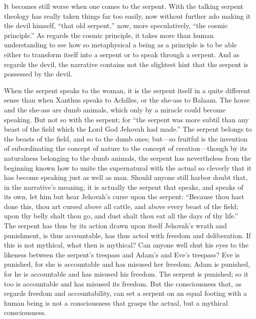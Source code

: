 \documentclass[12pt]{book}
\newcommand{\opage}[1]{\marginnote{\footnotesize\textit{[#1]}}}
\begin{document}
It becomes still worse when one comes to the serpent. With the talking
serpent theology has really taken things far too easily, now without
further ado making it the devil himself, ``that old serpent,'' now, more
speculatively, ``the cosmic principle.'' As regards the cosmic
principle, it takes more than human understanding to see how so
metaphysical a being as a principle is to be able either to transform
itself into a serpent or to speak through a serpent. And as regards the
devil, the narrative contains not the slightest hint that the serpent
is possessed by the devil.

When the serpent speaks to the woman, it is the serpent itself in a
quite different sense than when Xanthus speaks to Achilles, or the
she-ass to Balaam. The horse and the she-ass are dumb animals, which
only by a miracle could become speaking. But not so with the serpent;
for ``the serpent was more subtil than any beast of the field which the
Lord God Jehovah had made.'' The serpent belongs to the beasts of the
field, and so to the dumb ones; but---so fruitful is the invention of
subordinating the concept of nature to the concept of creation---though
by its naturalness belonging to the dumb animals, the serpent has
nevertheless from the beginning known how to unite the supernatural with
the actual so cleverly that it has become speaking
\opage{163}\setcounter{footnote}{0}%
just as well as man. Should anyone still harbor doubt that, in the
narrative's meaning, it is actually the serpent that speaks, and speaks
of its own, let him but hear Jehovah's curse upon the serpent: ``Because
thou hast done this, thou art cursed above all cattle, and above every
beast of the field; upon thy belly shalt thou go, and dust shalt thou
eat all the days of thy life.'' The serpent has thus by its action drawn
upon itself Jehovah's wrath and punishment, is thus accountable, has
thus acted with freedom and deliberation. If this is not mythical, what
then is mythical? Can anyone well shut his eyes to the likeness between
the serpent's trespass and Adam's and Eve's trespass? Eve is punished,
for she is accountable and has misused her freedom; Adam is punished,
for he is accountable and has misused his freedom. The serpent is
punished; so it too is accountable and has misused its freedom. But the
consciousness that, as regards freedom and accountability, can set a
serpent on an equal footing with a human being is not a consciousness
that grasps the actual, but a mythical consciousness.
\end{document}
